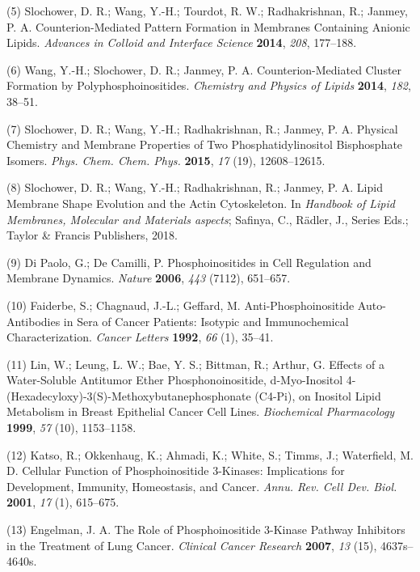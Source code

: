 \documentclass[11pt,notitlepage]{article}
\begin{document}
\leavevmode\hypertarget{ref-SdO7fVnR}{}%
(5) Slochower, D. R.; Wang, Y.-H.; Tourdot, R. W.; Radhakrishnan, R.;
Janmey, P. A. Counterion-Mediated Pattern Formation in Membranes
Containing Anionic Lipids. \emph{Advances in Colloid and Interface
Science} \textbf{2014}, \emph{208}, 177--188.

\leavevmode\hypertarget{ref-Ag1rh6TA}{}%
(6) Wang, Y.-H.; Slochower, D. R.; Janmey, P. A. Counterion-Mediated
Cluster Formation by Polyphosphoinositides. \emph{Chemistry and Physics
of Lipids} \textbf{2014}, \emph{182}, 38--51.

\leavevmode\hypertarget{ref-1E1rz4J4o}{}%
(7) Slochower, D. R.; Wang, Y.-H.; Radhakrishnan, R.; Janmey, P. A.
Physical Chemistry and Membrane Properties of Two Phosphatidylinositol
Bisphosphate Isomers. \emph{Phys. Chem. Chem. Phys.} \textbf{2015},
\emph{17} (19), 12608--12615.

\leavevmode\hypertarget{ref-1AHXI1BtY}{}%
(8) Slochower, D. R.; Wang, Y.-H.; Radhakrishnan, R.; Janmey, P. A.
Lipid Membrane Shape Evolution and the Actin Cytoskeleton. In
\emph{Handbook of Lipid Membranes, Molecular and Materials aspects};
Safinya, C., Rädler, J., Series Eds.; Taylor \& Francis Publishers,
2018.

\leavevmode\hypertarget{ref-GGlssBvj}{}%
(9) Di Paolo, G.; De Camilli, P. Phosphoinositides in Cell Regulation
and Membrane Dynamics. \emph{Nature} \textbf{2006}, \emph{443} (7112),
651--657.

\leavevmode\hypertarget{ref-8Xw2kuUO}{}%
(10) Faiderbe, S.; Chagnaud, J.-L.; Geffard, M. Anti-Phosphoinositide
Auto-Antibodies in Sera of Cancer Patients: Isotypic and Immunochemical
Characterization. \emph{Cancer Letters} \textbf{1992}, \emph{66} (1),
35--41.

\leavevmode\hypertarget{ref-12CAxA8dE}{}%
(11) Lin, W.; Leung, L. W.; Bae, Y. S.; Bittman, R.; Arthur, G. Effects
of a Water-Soluble Antitumor Ether Phosphonoinositide, d-Myo-Inositol
4-(Hexadecyloxy)-3(S)-Methoxybutanephosphonate (C4-Pi), on Inositol
Lipid Metabolism in Breast Epithelial Cancer Cell Lines.
\emph{Biochemical Pharmacology} \textbf{1999}, \emph{57} (10),
1153--1158.

\leavevmode\hypertarget{ref-l2gqdgv}{}%
(12) Katso, R.; Okkenhaug, K.; Ahmadi, K.; White, S.; Timms, J.;
Waterfield, M. D. Cellular Function of Phosphoinositide 3-Kinases:
Implications for Development, Immunity, Homeostasis, and Cancer.
\emph{Annu. Rev. Cell Dev. Biol.} \textbf{2001}, \emph{17} (1),
615--675.

\leavevmode\hypertarget{ref-izLqFTEH}{}%
(13) Engelman, J. A. The Role of Phosphoinositide 3-Kinase Pathway
Inhibitors in the Treatment of Lung Cancer. \emph{Clinical Cancer
Research} \textbf{2007}, \emph{13} (15), 4637s--4640s.
\end{document}
